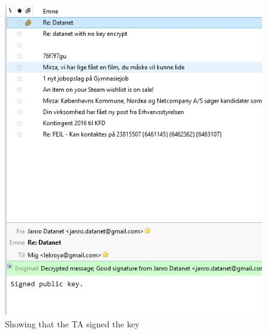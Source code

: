 \documentclass{sig-alternate-05-2015}
\begin{document}
\begin{figure}[H]
  \centering
  \includegraphics[scale=1]{signedkey.jpg}
  \caption{Showing that the TA signed the key}
\end{figure}
\end{document}
